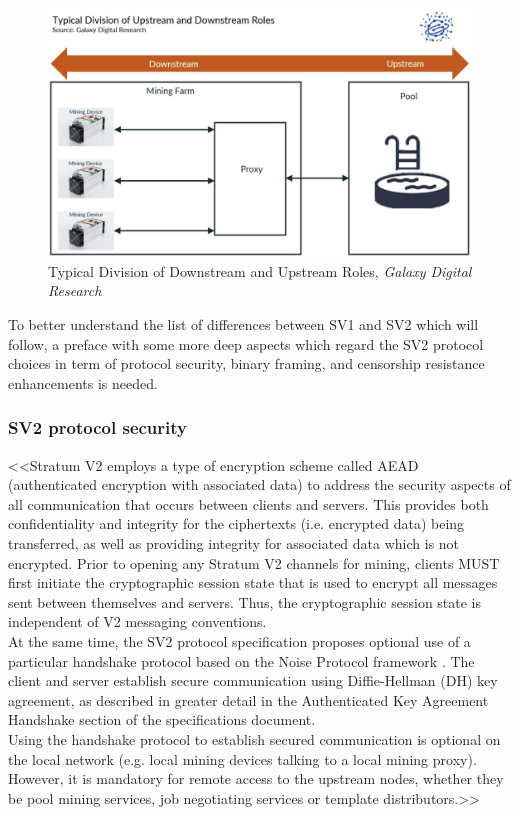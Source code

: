 \begin{figure}[h!]
    \centering
    \includegraphics[width=15cm]{Figures/sv2/sv2_2.png}
    \caption{Typical Division of Downstream and Upstream Roles, \textit{Galaxy Digital Research} \cite{galaxyFutureBitcoin}}
    \label{fig:sv2_2}
\end{figure}

To better understand the list of differences between SV1 and SV2 which will follow, a preface with some more deep aspects which regard the SV2 protocol choices in term of protocol security, binary framing, and censorship resistance enhancements is needed.

\subsubsection{SV2 protocol security}\label{sssec:sv2:security} <<Stratum V2 employs a type of encryption scheme called AEAD (authenticated encryption with associated data) to address the security aspects of all communication that occurs between clients and servers. This provides both confidentiality and integrity for the ciphertexts (i.e. encrypted data) being transferred, as well as providing integrity for associated data which is not encrypted. Prior to opening any Stratum V2 channels for mining, clients MUST first initiate the cryptographic session state that is used to encrypt all messages sent between themselves and servers. Thus, the cryptographic session state is independent of V2 messaging conventions.\\
At the same time, the SV2 protocol specification proposes optional use of a particular handshake protocol based on the Noise Protocol framework \cite{noiseprotocolNoiseProtocol}. The client and server establish secure communication using Diffie-Hellman (DH) key agreement, as described in greater detail in the Authenticated Key Agreement Handshake section of the specifications document.\\
Using the handshake protocol to establish secured communication is optional on the local network (e.g. local mining devices talking to a local mining proxy). However, it is mandatory for remote access to the upstream nodes, whether they be pool mining services, job negotiating services or template distributors.>> \cite{githubSv2spec04ProtocolSecuritymdMain}\\\\

